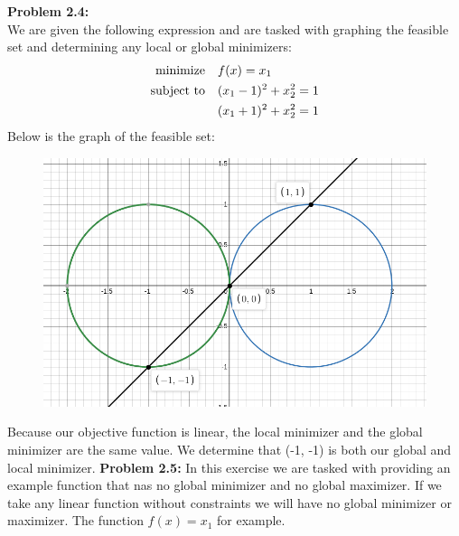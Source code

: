\documentclass{article}
\begin{document}
 
\pagestyle{fancy}

\textbf{Problem 2.4:} \\
We are given the following expression and are tasked with graphing the feasible set and determining any local or global minimizers:
\begin{align*}
    \text{minimize} &\null \quad f(x) = x_1 \\
    \text{subject to} &\null \quad (x_1 - 1)^2 + x_2^2 = 1 \\ 
    &\null \quad (x_1+1)^2 + x_2^2 = 1
\end{align*}
Below is the graph of the feasible set:

\begin{figure}[H]
    \centering
    \includegraphics[scale = 0.40]{desmos1.png}
\end{figure}
Because our objective function is linear, the local minimizer and the global minimizer are the same value. We determine that (-1, -1) is both our global and local minimizer.
\break
\break
\textbf{Problem 2.5:} In this exercise we are tasked with providing an example function that nas no global minimizer and no global maximizer. If we take any linear function without constraints we will have no global minimizer or maximizer. The function $f(x) = x_1$ for example.

       
\end{document}
